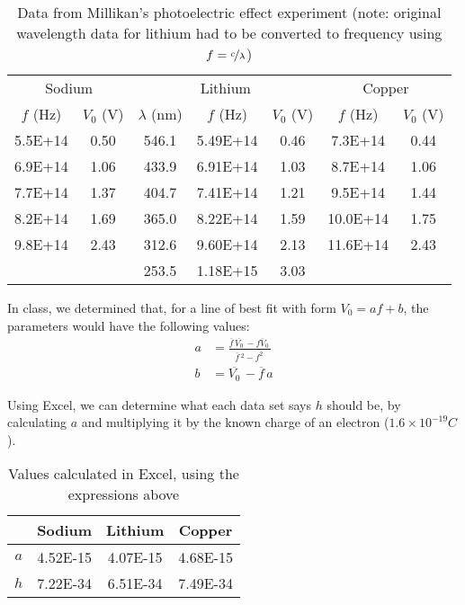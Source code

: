 \documentclass{article}
\newcommand{\ol}[1]{\overline{#1}\,} %
\begin{document}
\begin{table}[H]
	\centering
	\begin{tabular}{cc|ccc|cc}
		\toprule
		\multicolumn{2}{c|}{Sodium} & \multicolumn{3}{c|}{Lithium} & \multicolumn{2}{c}{Copper} \\
		$f$ (Hz) & $V_0$ (V) & $\lambda$ (nm) & $f$ (Hz) & $V_0$ (V) & $f$ (Hz) & $V_0$ (V) \\
		\midrule
		5.5E+14	& 0.50	& 546.1	& 5.49E+14 & 0.46	& 7.3E+14	& 0.44 \\
		6.9E+14	& 1.06	& 433.9	& 6.91E+14 & 1.03	& 8.7E+14	& 1.06 \\
		7.7E+14	& 1.37	& 404.7	& 7.41E+14 & 1.21	& 9.5E+14	& 1.44 \\
		8.2E+14	& 1.69	& 365.0	& 8.22E+14 & 1.59	& 10.0E+14	& 1.75 \\
		9.8E+14	& 2.43	& 312.6	& 9.60E+14 & 2.13	& 11.6E+14	& 2.43 \\
				& 		& 253.5 & 1.18E+15 & 3.03	& 			& 	   \\
		\bottomrule
	\end{tabular}
	\caption{Data from Millikan's photoelectric effect experiment (note: original \\wavelength data for lithium had to be converted to frequency using $f = \nicefrac{c}{\lambda}$)}
\end{table}

In class, we determined that, for a line of best fit with form $V_0 = af + b$, the parameters would have the following values:
\begin{equation}
\begin{aligned}
a &= \frac{\ol{f}\ol{V_0} - \ol{fV_0}}{\ol{f}^2 - \ol{f^2}} \\
b &= \ol{V_0} - \ol{f}a
\end{aligned}
\end{equation}

Using Excel, we can determine what each data set says $h$ should be, by calculating $a$ and multiplying it by the known charge of an electron ($1.6 \times 10^{-19} C $).
\begin{table}[H]
	\centering
	\begin{tabular}{cccc}
		\toprule
		& Sodium & Lithium & Copper \\
		\midrule
		$a$ & 4.52E-15 & 4.07E-15 & 4.68E-15 \\
		$h$ & 7.22E-34 & 6.51E-34 & 7.49E-34 \\
		\bottomrule
\end{tabular}
\caption{Values calculated in Excel, using the expressions above}
\end{table}
\end{document}
